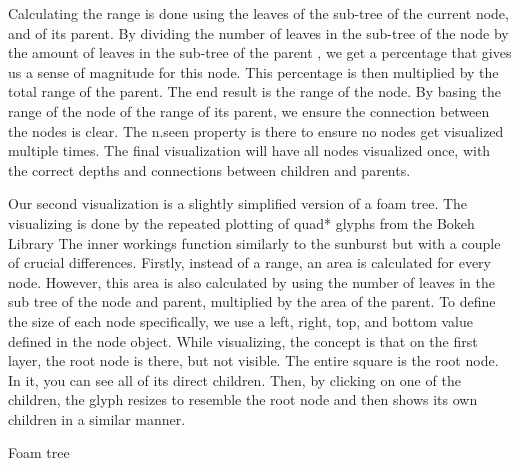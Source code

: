\documentclass[journal, 9pt]{vgtc}                %
\begin{document}
Calculating the range is done using the leaves of the sub-tree of the current node, and of its parent. By dividing the number of leaves in the sub-tree of the node by the amount of leaves in the sub-tree of the parent , we get a percentage that gives us a sense of magnitude for this node.
This percentage is then multiplied by the total range of the parent. The end result is the range of the node. By basing the range of the node of the range of its parent, we ensure the connection between the nodes is clear. The n.seen property is there to ensure no nodes get visualized multiple times.
The final visualization will have all nodes visualized once, with the correct depths and connections between children and parents. 

\vspace{10mm}

Our second visualization is a slightly simplified version of a foam tree. The visualizing is done by the repeated plotting of quad* glyphs from the Bokeh Library The inner workings function similarly to the sunburst but with a couple of crucial differences. Firstly, instead of a range, an area is calculated for every node. However, this area is also calculated by using the number of leaves in the sub tree of the node and parent, multiplied by the area of the parent. To define the size of each node specifically, we use a left, right, top, and bottom value defined in the node object. While visualizing, the concept is that on the first layer, the root node is there, but not visible. The entire square is the root node. In it, you can see all of its direct children. Then, by clicking on one of the children,
the glyph resizes to resemble the root node and then shows its own children in a similar manner. 

\begin{algorithm}
\caption{Foam tree}
\begin{algorithmic}[1]
\Else{}
\EndIf
{}
\EndIf
{}
\Else{}
\EndIf
{}
\EndFor
\EndIf
\end{algorithmic}
\end{algorithm}
\end{document}
